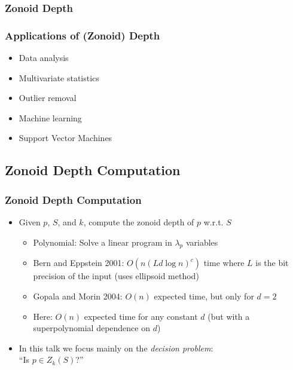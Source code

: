 \documentclass{beamer}
\begin{document}
\frame
{
    \frametitle{Zonoid Depth}
}

\frame
{
   \frametitle{Applications of (Zonoid) Depth}
   \begin{itemize}
    \item<1-> Data analysis
    \item<2-> Multivariate statistics
    \item<3-> Outlier removal
    \item<4-> Machine learning 
    \item<5-> Support Vector Machines
   \end{itemize}
}


\subsection{Zonoid Depth Computation}
\frame
{
  \frametitle{Zonoid Depth Computation}
  \begin{itemize}
  \item<1-> Given $p$, $S$, and $k$, compute the zonoid depth of $p$
w.r.t. $S$
     \begin{itemize}  
       \item<2-> Polynomial: Solve a linear program in $\lambda_p$ 
		variables
       \item<3-> Bern and Eppstein 2001:  $O(n(Ld\log n)^c)$ time where $L$
            is the bit precision of the input  (uses ellipsoid method)
       \item<4-> Gopala and Morin 2004: $O(n)$ expected time, but only
            for $d=2$
       \item<5-> Here: $O(n)$ expected time for any constant $d$ (but
            with a superpolynomial dependence on $d$)
     \end{itemize}
     \item<6-> In this talk we focus mainly on the \emph{decision 
          problem}:  \\ ``Is $p\in Z_k(S)$?''
  \end{itemize}
}
\end{document}
